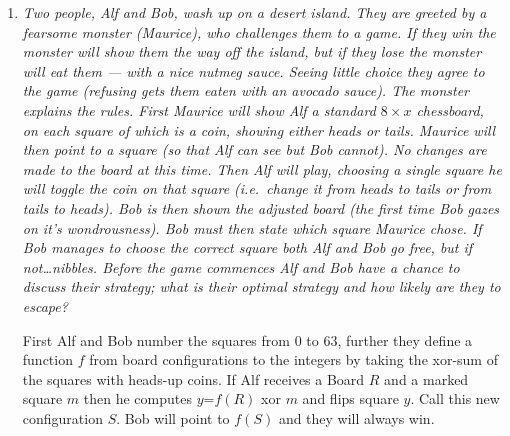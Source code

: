 \documentclass{article}
\begin{document}
\begin{enumerate}[1.]
\vspace{6pt}
\item %
{\itshape Two people, Alf and Bob, wash up on a desert island. They are greeted by a fearsome monster (Maurice), who challenges them to a game. If they win the monster will show them the way off the island, but if they lose the monster will eat them --- with a nice nutmeg sauce. Seeing little choice they agree to the game (refusing gets them eaten with an avocado sauce). The monster explains the rules. First Maurice will show Alf a standard $8 \times x$ chessboard, on each square of which is a coin, showing either heads or tails. Maurice will then point to a square (so that Alf can see but Bob cannot). No changes are made to the board at this time. Then Alf will play, choosing a single square he will toggle the coin on that square (i.e.\ change it from heads to tails or from tails to heads). Bob is then shown the adjusted board (the first time Bob gazes on it's wondrousness). Bob must then state which square Maurice chose. If Bob manages to choose the correct square both Alf and Bob go free, but if not\dots nibbles. Before the game commences Alf and Bob have a chance to discuss their strategy; what is their optimal strategy and how likely are they to escape?}

First Alf and Bob number the squares from 0 to 63, further they define a function $f$ from board configurations to the integers by taking the xor-sum of the squares with heads-up coins. If Alf receives a Board $R$ and a marked square $m$ then he computes $y$=$f(R)$ xor $m$ and flips square  $y$. Call this new configuration $S$. Bob will point to $f(S)$ and they will always win.  
\end{enumerate}
\end{document}
